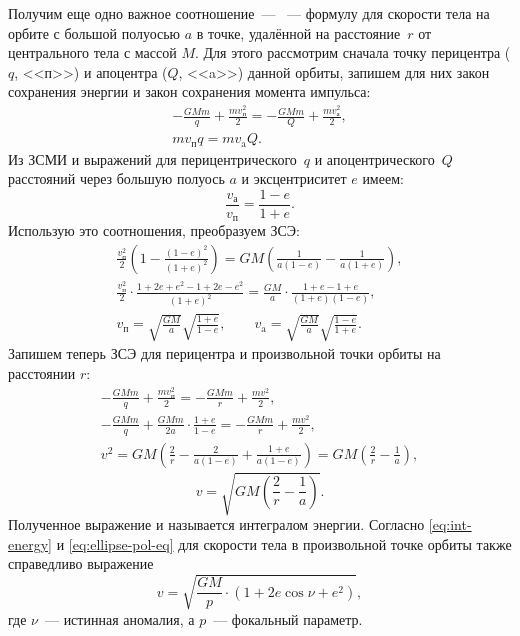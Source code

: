 Получим еще одно важное соотношение~--- ~--- формулу для скорости тела на орбите с большой полуосью $a$ в точке, удалённой на расстояние~$r$ от центрального тела с массой $M$. Для этого рассмотрим  сначала точку перицентра ($q$, <<п>>) и апоцентра ($Q$, <<a>>) данной орбиты, запишем для них закон сохранения энергии и закон сохранения момента импульса:
\begin{gather*}
	-\frac{GMm}{q} + \frac{m v^2_\text{п}}{2} = -\frac{GMm}{Q} + \frac{m v^2_\text{а}}{2},\\
	mv_\text{п}q = mv_\text{a}Q.
\end{gather*}
Из ЗСМИ и выражений для перицентрического~$q$ и апоцентрического~$Q$ расстояний через большую полуось $a$ и эксцентриситет $e$ имеем:
\begin{equation*}
	\frac{v_\text{а}}{v_\text{п}} = \frac{1 - e}{1 + e}.
\end{equation*}
Использую это соотношения, преобразуем ЗСЭ:
\begin{gather}
	\frac{v_\text{п}^2}{2} \left( 1 - \frac{(1 -e)^2}{(1 + e)^2} \right) = GM \left( \frac{1}{a(1-e)} - \frac{1}{a(1+e)} \right),\\
	\frac{v_\text{п}^2}{2} \cdot \frac{ 1 + 2e + e^2 - 1 + 2e - e^2}{(1+e)^2} = \frac{GM}{a} \cdot \frac{1 + e - 1 +  e}{(1+e)(1-e)},\\
	v_\text{п} = \sqrt{\frac{GM}{a}}\sqrt{\frac{1+e}{1-e}}, \quad \quad v_\text{a} = \sqrt{\frac{GM}{a}}\sqrt{\frac{1-e}{1+e}}.
\end{gather}
Запишем теперь ЗСЭ для перицентра и произвольной точки орбиты на расстоянии $r$:
\begin{gather*}
	-\frac{GMm}{q} + \frac{m v^2_\text{п}}{2} = -\frac{GMm}{r} + \frac{m v^2}{2},\\
	-\frac{GMm}{q} + \frac{GMm}{2a} \cdot \frac{1+e}{1-e} = -\frac{GMm}{r} + \frac{m v^2}{2},\\
	v^2 = GM \left( \frac{2}{r} - \frac{2}{a(1 - e)} + \frac{1+e}{a (1-e) }\right) = GM \left( \frac{2}{r} - \frac{1}{a} \right),
\end{gather*}
\begin{equation}
	v = \sqrt{ GM \left( \frac{2}{r} - \frac{1}{a} \right)}.
	\label{eq:int-energy}
\end{equation}
Полученное выражение и называется интегралом энергии. Согласно \eqref{eq:int-energy} и \eqref{eq:ellipse-pol-eq} для скорости тела в произвольной точке орбиты также справедливо выражение
\begin{equation}
	v = \sqrt{\frac{GM}{p}\cdot(1 + 2 e \cos \nu + e^2)},
\end{equation}
где $\nu$~--- истинная аномалия, а $p$~--- фокальный параметр.

